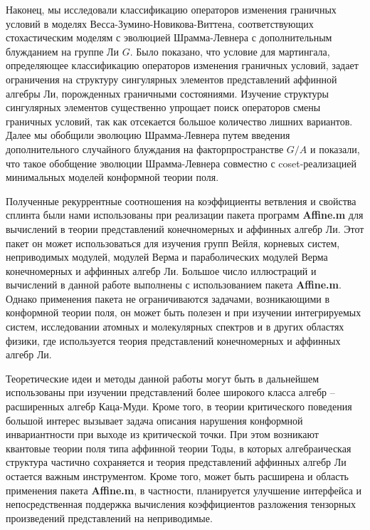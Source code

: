 Наконец, мы исследовали классификацию операторов изменения граничных условий в моделях Весса-Зумино-Новикова-Виттена, соответствующих стохастическим моделям с эволюцией Шрамма-Левнера с дополнительным блужданием на группе Ли $G$. Было показано, что условие для мартингала, определяющее классификацию операторов изменения граничных условий, задает ограничения на структуру сингулярных элементов представлений аффинной алгебры Ли, порожденных граничными состояниями. Изучение структуры сингулярных элементов существенно упрощает поиск операторов смены граничных условий, так как отсекается большое количество лишних вариантов. Далее мы обобщили эволюцию Шрамма-Левнера путем введения дополнительного случайного блуждания на факторпространстве $G/A$ и показали, что такое обобщение эволюции Шрамма-Левнера совместно с coset-реализацией минимальных моделей конформной теории поля. 

Полученные рекуррентные соотношения на коэффициенты ветвления и свойства сплинта были нами использованы при реализации пакета программ {\bf Affine.m}  для вычислений в теории представлений конечномерных и аффинных алгебр Ли. Этот пакет он может использоваться для изучения групп Вейля, корневых систем, неприводимых модулей, модулей Верма и параболических модулей Верма конечномерных и аффинных алгебр Ли. Большое число иллюстраций и вычислений в данной работе выполнены с использованием пакета  {\bf Affine.m}. Однако применения пакета не ограничиваются задачами, возникающими в конформной теории поля, он может быть полезен и при изучении интегрируемых систем, исследовании атомных и молекулярных спектров и в других областях физики, где используется теория представлений конечномерных и аффинных алгебр Ли. 

Теоретические идеи и методы данной работы могут быть в дальнейшем использованы при изучении представлений более широкого класса алгебр -- расширенных алгебр Каца-Муди. Кроме того, в теории критического поведения большой интерес вызывает задача описания нарушения конформной инвариантности при выходе из критической точки. При этом возникают квантовые теории поля типа аффинной теории Тоды, в которых алгебраическая структура частично сохраняется и теория представлений аффинных алгебр Ли остается важным инструментом. Кроме того, может быть расширена и область применения пакета {\bf Affine.m}, в частности, планируется улучшение интерфейса и непосредственная поддержка вычисления коэффициентов разложения тензорных произведений представлений на неприводимые. 


